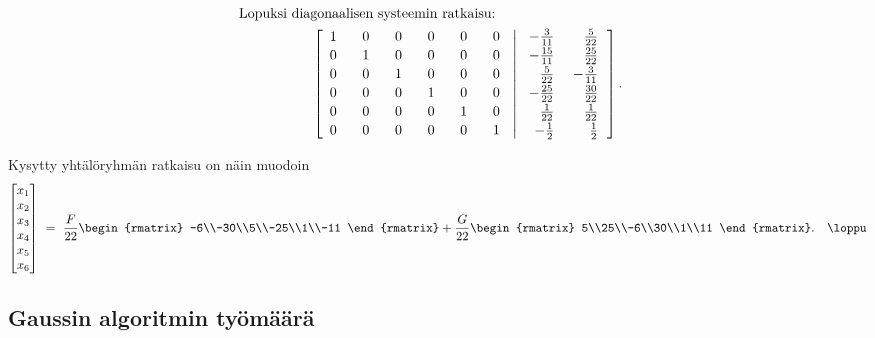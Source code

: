 \begin{align*}
\intertext{Lopuksi diagonaalisen systeemin ratkaisu:}
&\phantom{(k=2)} \qquad 
              \left[\begin{array}{rrrrrr} 
                    1&\,\ \ 0&\,\ \ 0&\,\ \ 0&\,\ \ 0&\,\ \ 0\\[0.5mm] 0&1&0&0&0&0\\[0.5mm] 
                    0&0&1&0&0&0\\[0.5mm]
                    0&0&0&1&0&0\\[0.5mm] 0&0&0&0&1&0\\[0.5mm] 0&0&0&0&0&1 
                    \end{array} \right.
       \left. \left|\begin{array}{rr}
                    -\frac{3}{11}&\frac{5}{22}\\[0.5mm]-\frac{15}{11}&\frac{25}{22}\\[0.5mm]
                    \frac{5}{22}&\ -\frac{3}{11}\\[0.5mm]\ -\frac{25}{22}&\frac{30}{22}\\[0.5mm]
                    \frac{1}{22}&\frac{1}{22}\\[0.5mm]-\frac{1}{2}&\frac{1}{2}
                    \end{array} \right. \right].
\end{align*}

Kysytty yhtälöryhmän ratkaisu on näin muodoin
\[ 
\begin{bmatrix} x_1\\x_2\\x_3\\x_4\\x_5\\x_6 \end{bmatrix}\ =\
               \frac{F}{22} \begin{rmatrix} -6\\-30\\5\\-25\\1\\-11 \end{rmatrix}
              +\frac{G}{22} \begin{rmatrix} 5\\25\\-6\\30\\1\\11 \end{rmatrix}. \quad \loppu
\]

\subsection*{Gaussin algoritmin työmäärä}


